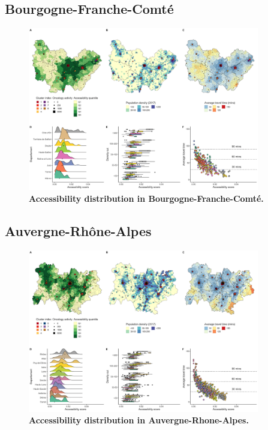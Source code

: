\subsection*{Bourgogne-Franche-Comté}

\begin{figure}[H]
    \includegraphics[width=0.9\textwidth]{images/camion/region_accessibility/accessibility_Bourgogne-Franche-Comte.png}
    \centering
    \caption{
        \textbf{Accessibility distribution in Bourgogne-Franche-Comté.}
    }
\end{figure}

\subsection*{Auvergne-Rhône-Alpes}

\begin{figure}[H]
    \includegraphics[width=0.9\textwidth]{images/camion/region_accessibility/accessibility_Auvergne-Rhone-Alpes.png}
    \centering
    \caption{
        \textbf{Accessibility distribution in Auvergne-Rhone-Alpes.}
    }
\end{figure}

